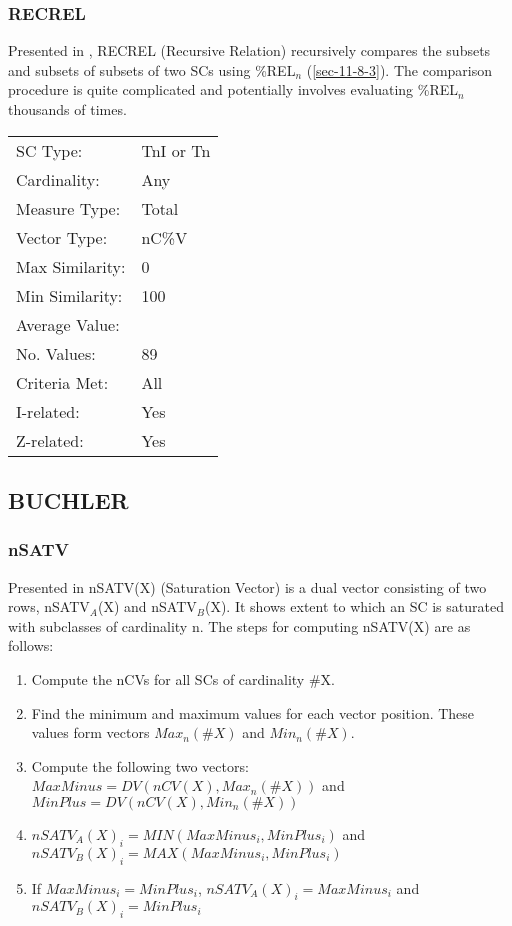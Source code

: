 \documentclass{article}
\begin{document}
\subsubsection{RECREL}
\label{sec-11-8-5}

Presented in \citet{Castren1994}, RECREL (Recursive Relation)
recursively compares the subsets and subsets of subsets of two SCs
using \%REL$_{n}$ (\ref{sec-11-8-3}). The comparison procedure is quite
complicated and potentially involves evaluating \%REL$_{n}$ thousands of
times.

\begin{center}
\begin{tabular}{ll}
 SC Type:         &  TnI or Tn  \\
 Cardinality:     &  Any        \\
 Measure Type:    &  Total      \\
 Vector Type:     &  nC\%V      \\
 Max Similarity:  &  0          \\
 Min Similarity:  &  100        \\
 Average Value:   &             \\
 No. Values:      &  89         \\
 Criteria Met:    &  All        \\
 I-related:       &  Yes        \\
 Z-related:       &  Yes        \\
\end{tabular}
\end{center}
\subsection{BUCHLER}
\label{sec-11-9}
\subsubsection{nSATV}
\label{sec-11-9-1}

Presented in \citet[chap. 2.3]{Buchler1997} nSATV(X) (Saturation
Vector) is a dual vector consisting of two rows, nSATV$_{A}$(X) and
nSATV$_{B}$(X). It shows extent to which an SC is saturated with
subclasses of cardinality n. The steps for computing nSATV(X) are
as follows:

\begin{enumerate}
\item Compute the nCVs for all SCs of cardinality \#X.
\item Find the minimum and maximum values for each vector position. These
   values form vectors $Max_{n}(\#X)$ and $Min_{n}(\#X)$.
\item Compute the following two vectors:
   $MaxMinus=DV(nCV(X),Max_{n}(\#X))$ and $MinPlus=DV(nCV(X),Min_{n}(\#X))$
\item $nSATV_{A}(X)_{i}=MIN(MaxMinus_{i},MinPlus_{i})$ and
   $nSATV_{B}(X)_{i}=MAX(MaxMinus_{i},MinPlus_{i})$
\item If $MaxMinus_{i}=MinPlus_{i}$, $nSATV_{A}(X)_{i}=MaxMinus_{i}$
   and $nSATV_{B}(X)_{i}=MinPlus_{i}$
\end{enumerate}
\end{document}
